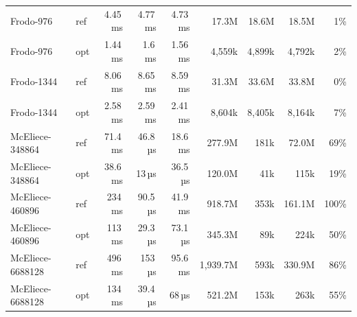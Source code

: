 \begin{tabular}{llrrrrrrr}
Frodo-976 & ref & 4.45\,ms & 4.77\,ms & 4.73\,ms & 17.3M & 18.6M & 18.5M & 1\% \\
Frodo-976 & opt & 1.44\,ms & 1.6\,ms & 1.56\,ms & 4,559k & 4,899k & 4,792k & 2\% \\
Frodo-1344 & ref & 8.06\,ms & 8.65\,ms & 8.59\,ms & 31.3M & 33.6M & 33.8M & 0\% \\
Frodo-1344 & opt & 2.58\,ms & 2.59\,ms & 2.41\,ms & 8,604k & 8,405k & 8,164k & 7\% \\
\midrule
McEliece-348864 & ref & 71.4\,ms & 46.8\,µs & 18.6\,ms & 277.9M & 181k & 72.0M & 69\% \\
McEliece-348864 & opt & 38.6\,ms & 13\,µs & 36.5\,µs & 120.0M & 41k & 115k & 19\% \\
McEliece-460896 & ref & 234\,ms & 90.5\,µs & 41.9\,ms & 918.7M & 353k & 161.1M & 100\% \\
McEliece-460896 & opt & 113\,ms & 29.3\,µs & 73.1\,µs & 345.3M & 89k & 224k & 50\% \\
McEliece-6688128 & ref & 496\,ms & 153\,µs & 95.6\,ms & 1,939.7M & 593k & 330.9M & 86\% \\
McEliece-6688128 & opt & 134\,ms & 39.4\,µs & 68\,µs & 521.2M & 153k & 263k & 55\% \\
\bottomrule
\end{tabular}
